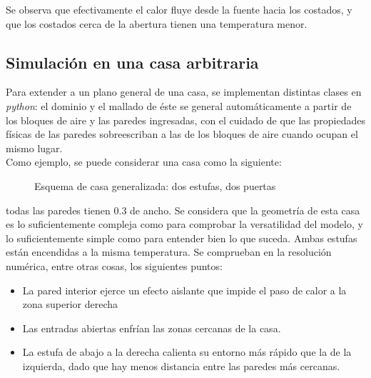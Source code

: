 \documentclass[12pt,paperletter]{article}
\begin{document}
Se observa que efectivamente el calor fluye desde la fuente hacia los costados, y que los costados cerca de la abertura tienen una temperatura menor.

\subsection{Simulación en una casa arbitraria}

Para extender a un plano general de una casa, se implementan distintas clases en \textit{python}: el dominio y el mallado de éste se general automáticamente a partir de los bloques de aire y las paredes ingresadas, con el cuidado de que las propiedades físicas de las paredes sobreescriban a las de los bloques de aire cuando ocupan el mismo lugar.\\

Como ejemplo, se puede considerar una casa como la siguiente:

\begin{figure}[H]
\begin{center}
\end{center}
    \caption{Esquema de casa generalizada: dos estufas, dos puertas}
    \label{mapita}
\end{figure}

todas las paredes tienen 0.3 de ancho. Se considera que la geometría de esta casa es lo suficientemente compleja como para comprobar la versatilidad del modelo, y lo suficientemente simple como para entender bien lo que suceda. Ambas estufas están encendidas a la misma temperatura. Se comprueban en la resolución numérica, entre otras cosas, los siguientes puntos:

\begin{itemize}
    \item La pared interior ejerce un efecto aislante que impide el paso de calor a la zona superior derecha
    \item Las entradas abiertas enfrían las zonas cercanas de la casa.
    \item La estufa de abajo a la derecha calienta su entorno más rápido que la de la izquierda, dado que hay menos distancia entre las paredes más cercanas.
\end{itemize}
\end{document}
